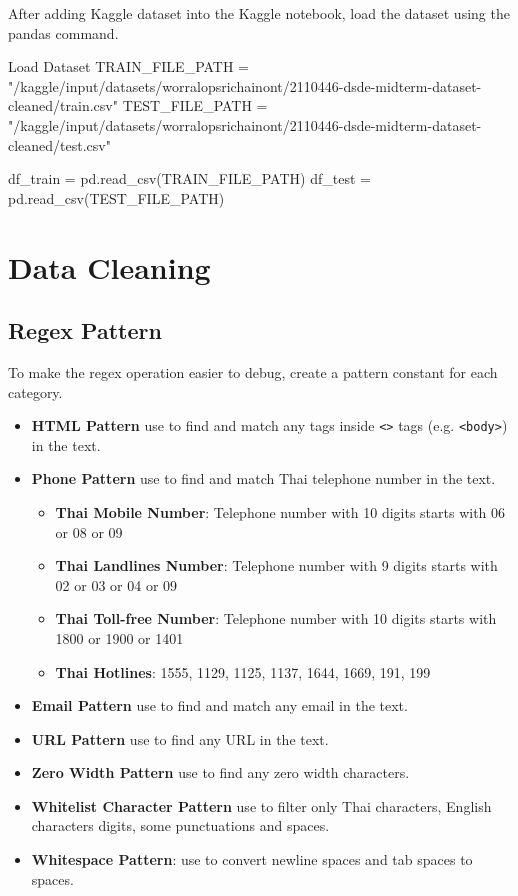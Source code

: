 \documentclass[12pt, a4paper]{article}
\begin{document}
            After adding Kaggle dataset into the Kaggle notebook, load the dataset using the pandas command.

            \begin{codeblock}{Load Dataset}
                TRAIN_FILE_PATH = "/kaggle/input/datasets/worralopsrichainont/2110446-dsde-midterm-dataset-cleaned/train.csv"
                TEST_FILE_PATH = "/kaggle/input/datasets/worralopsrichainont/2110446-dsde-midterm-dataset-cleaned/test.csv"

                df_train = pd.read_csv(TRAIN_FILE_PATH)
                df_test = pd.read_csv(TEST_FILE_PATH)
            \end{codeblock}

        \section{Data Cleaning}
            \subsection{Regex Pattern}
                To make the regex operation easier to debug, create a pattern constant for each category.
                \begin{itemize}
                    \item \textbf{HTML Pattern} use to find and match any tags inside \texttt{<>} tags (e.g. \texttt{<body>}) in the text.
                    \item \textbf{Phone Pattern} use to find and match Thai telephone number in the text.
                    \begin{itemize}
                        \item \textbf{Thai Mobile Number}: Telephone number with 10 digits starts with 06 or 08 or 09
                        \item \textbf{Thai Landlines Number}: Telephone number with 9 digits starts with 02 or 03 or 04 or 09
                        \item \textbf{Thai Toll-free Number}: Telephone number with 10 digits starts with 1800 or 1900 or 1401
                        \item \textbf{Thai Hotlines}: 1555, 1129, 1125, 1137, 1644, 1669, 191, 199
                    \end{itemize}
                    \item \textbf{Email Pattern} use to find and match any email in the text.
                    \item \textbf{URL Pattern} use to find any URL in the text.
                    \item \textbf{Zero Width Pattern} use to find any zero width characters.
                    \item \textbf{Whitelist Character Pattern} use to filter only Thai characters, English characters
                    digits, some punctuations and spaces.
                    \item \textbf{Whitespace Pattern}: use to convert newline spaces and tab spaces to spaces.
                \end{itemize}
\end{document}

